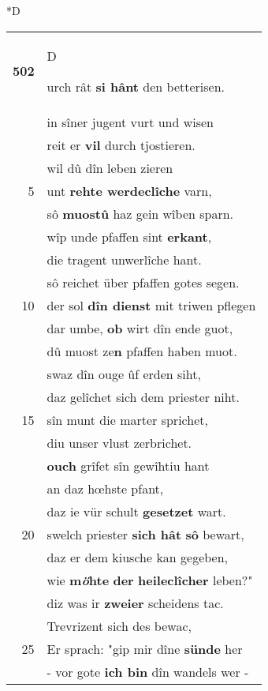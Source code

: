 \documentclass[8pt,a4paper,notitlepage]{article}
\begin{document}
\begin{table}[ht]
\begin{minipage}[t]{0.5\linewidth}
\small
\begin{center}*D
\end{center}
\begin{tabular}{rl}
\textbf{502} & \begin{large}D\end{large}urch rât \textbf{si hânt} den betterisen.\\ 
 & in sîner jugent vurt und wisen\\ 
 & reit er \textbf{vil} durch tjostieren.\\ 
 & wil dû dîn leben zieren\\ 
5 & unt \textbf{rehte werdeclîche} varn,\\ 
 & sô \textbf{muostû} haz gein wîben sparn.\\ 
 & wîp unde pfaffen sint \textbf{erkant},\\ 
 & die tragent unwerlîche hant.\\ 
 & sô reichet über pfaffen gotes segen.\\ 
10 & der sol \textbf{dîn dienst} mit triwen pflegen\\ 
 & dar umbe, \textbf{ob} wirt dîn ende guot,\\ 
 & dû muost ze\textbf{n} pfaffen haben muot.\\ 
 & swaz dîn ouge ûf erden siht,\\ 
 & daz gelîchet sich dem priester niht.\\ 
15 & sîn munt die marter sprichet,\\ 
 & diu unser vlust zerbrichet.\\ 
 & \textbf{ouch} grîfet sîn gewîhtiu hant\\ 
 & an daz hœhste pfant,\\ 
 & daz ie vür schult \textbf{gesetzet} wart.\\ 
20 & swelch priester \textbf{sich hât} \textbf{sô} bewart,\\ 
 & daz er dem kiusche kan gegeben,\\ 
 & wie \textbf{m\textit{ö}hte} \textbf{der} \textbf{heileclîcher} leben?"\\ 
 & diz was ir \textbf{zweier} scheidens tac.\\ 
 & Trevrizent sich des bewac,\\ 
25 & Er sprach: "gip mir dîne \textbf{sünde} her\\ 
 & - vor gote \textbf{ich bin} dîn wandels wer -\\ 

\end{tabular}
\end{minipage}
\end{table}
\end{document}
